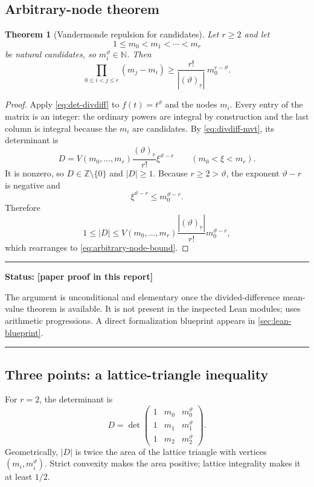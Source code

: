 \documentclass[11pt,oneside]{article}
\newtheorem{theorem}{Theorem}[section]
\theoremstyle{definition}
\theoremstyle{remark}
\newcommand{\N}{\mathbb N}
\newcommand{\Z}{\mathbb Z}
\newcommand{\thetaq}{\vartheta}
\newcommand{\fall}[2]{\left(#1\right)_{\!\underline{#2}}}
\newcommand{\statusnew}{\textcolor{newgreen}{\textbf{[paper proof in this report]}}}
\newenvironment{statusbox}[1]
{\begin{center}\begin{minipage}{0.94\textwidth}\raggedright\hbadness=10000\hrule\vspace{0.45em}\textbf{Status:} #1\par\vspace{0.35em}}
{\vspace{0.35em}\hrule\end{minipage}\end{center}}
\begin{document}
\subsection{Arbitrary-node theorem}

\begin{theorem}[Vandermonde repulsion for candidates]
\label{thm:arbitrary-node}
Let $r\ge2$ and let
\[
 1\le m_0<m_1<\cdots<m_r
\]
be natural candidates, so $m_i^{\thetaq}\in\N$.  Then
\begin{equation}
 \prod_{0\le i<j\le r}(m_j-m_i)
 \ge
 \frac{r!}{|\fall{\thetaq}{r}|}\,m_0^{r-\thetaq}.
 \label{eq:arbitrary-node-bound}
\end{equation}
\end{theorem}

\begin{proof}
Apply \eqref{eq:det-divdiff} to $f(t)=t^{\thetaq}$ and the nodes $m_i$.  Every entry of the
matrix is an integer: the ordinary powers are integral by construction and the last column is
integral because the $m_i$ are candidates.  By \eqref{eq:divdiff-mvt}, its determinant is
\[
 D=V(m_0,\ldots,m_r)
   \frac{\fall{\thetaq}{r}}{r!}\xi^{\thetaq-r}
\qquad(m_0<\xi<m_r).
\]
It is nonzero, so $D\in\Z\setminus\{0\}$ and $|D|\ge1$.  Because $r\ge2>\thetaq$, the exponent
$\thetaq-r$ is negative and
\[
 \xi^{\thetaq-r}\le m_0^{\thetaq-r}.
\]
Therefore
\[
 1\le |D|
 \le V(m_0,\ldots,m_r)
      \frac{|\fall{\thetaq}{r}|}{r!}m_0^{\thetaq-r},
\]
which rearranges to \eqref{eq:arbitrary-node-bound}.
\end{proof}

\begin{statusbox}{\statusnew}
The argument is unconditional and elementary once the divided-difference mean-value theorem
is available.  It is not present in the inspected Lean modules; 
uses arithmetic progressions.  A direct formalization blueprint appears in
\cref{sec:lean-blueprint}.
\end{statusbox}

\subsection{Three points: a lattice-triangle inequality}

For $r=2$, the determinant is
\[
 D=\det\begin{pmatrix}
 1&m_0&m_0^{\thetaq}\\
 1&m_1&m_1^{\thetaq}\\
 1&m_2&m_2^{\thetaq}
 \end{pmatrix}.
\]
Geometrically, $|D|$ is twice the area of the lattice triangle with vertices
$(m_i,m_i^{\thetaq})$.  Strict convexity makes the area positive; lattice integrality makes it
at least $1/2$.
\end{document}
